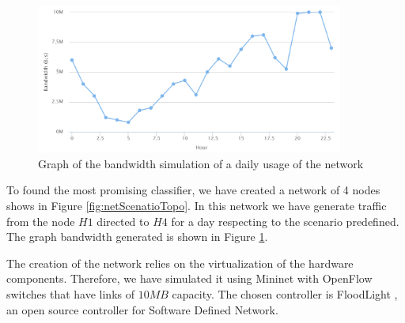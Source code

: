 \documentclass[12pt]{article}
\begin{document}
\begin{figure}[h!]
	\centering
	\includegraphics[width=0.9\textwidth]{img/networkScenario.png}
	\caption[]
	{Graph of the bandwidth simulation of a daily usage of the network}
	\label{fig:netScenarioConf}
\end{figure}


To found the most promising classifier, we have created a network of 4 nodes shows in Figure \ref{fig:netScenatioTopo}.
In this network we have generate traffic from the node $H1$ directed to $H4$ for a day respecting to the scenario predefined. The graph bandwidth generated is shown in Figure \ref{fig:netScenarioConf}.

The creation of the network relies on the virtualization of the hardware components.
Therefore, we have simulated it using Mininet \cite{mininet} with OpenFlow \cite{openflow} switches that have links of $10MB$ capacity.
The chosen controller is FloodLight \cite{floodlight}, an open source controller for Software Defined Network.
\end{document}
